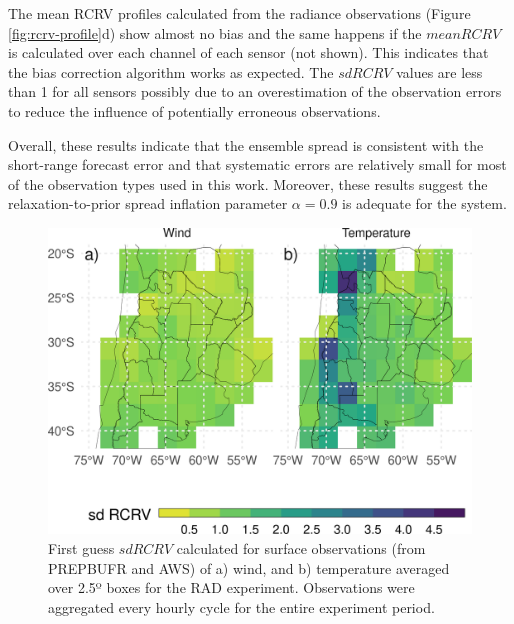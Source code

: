 \documentclass[final,5p,times,twocolumn,authoryear]{elsarticle} %
\begin{document}
The mean RCRV profiles calculated from the radiance observations (Figure \ref{fig:rcrv-profile}d) show almost no bias and the same happens if the \(mean RCRV\) is calculated over each channel of each sensor (not shown). This indicates that the bias correction algorithm works as expected. The \(sd RCRV\) values are less than 1 for all sensors possibly due to an overestimation of the observation errors to reduce the influence of potentially erroneous observations.

Overall, these results indicate that the ensemble spread is consistent with the short-range forecast error and that systematic errors are relatively small for most of the observation types used in this work. Moreover, these results suggest the relaxation-to-prior spread inflation parameter \(\alpha = 0.9\) is adequate for the system.



\begin{figure}
\includegraphics[width=1\linewidth]{../figures/rcrv-sfc-1} \caption{First guess \(sd RCRV\) calculated for surface observations (from PREPBUFR and AWS) of a) wind, and b) temperature averaged over 2.5º boxes for the RAD experiment. Observations were aggregated every hourly cycle for the entire experiment period.}\label{fig:rcrv-sfc}
\end{figure}
\end{document}
